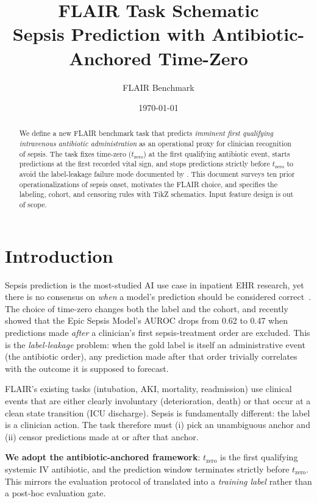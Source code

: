 \documentclass[11pt]{article}
\title{\textbf{FLAIR Task Schematic} \\[0.3em]
       Sepsis Prediction with Antibiotic-Anchored Time-Zero}
\author{FLAIR Benchmark}
\date{\today}
\newcommand{\tzero}{t_{\text{zero}}}
\begin{document}
\maketitle

\begin{abstract}
\noindent We define a new FLAIR benchmark task that predicts \emph{imminent
first qualifying intravenous antibiotic administration} as an
operational proxy for clinician recognition of sepsis. The task fixes
time-zero ($\tzero$) at the first qualifying antibiotic event, starts
predictions at the first recorded vital sign, and stops predictions
strictly before $\tzero$ to avoid the label-leakage failure mode
documented by \citet{kamran2024sepsis}. This document surveys ten prior
operationalizations of sepsis onset, motivates the FLAIR choice, and
specifies the labeling, cohort, and censoring rules with TikZ schematics.
Input feature design is out of scope.
\end{abstract}

\section{Introduction}

Sepsis prediction is the most-studied AI use case in inpatient EHR
research, yet there is no consensus on \emph{when} a model's prediction
should be considered correct~\citep{singer2016sepsis3, rhee2019sepsis}.
The choice of time-zero changes both the label and the cohort, and
\citet{kamran2024sepsis} recently showed that the Epic Sepsis Model's
AUROC drops from 0.62 to 0.47 when predictions made \emph{after} a
clinician's first sepsis-treatment order are excluded. This is the
\emph{label-leakage} problem: when the gold label is itself an
administrative event (the antibiotic order), any prediction made after
that order trivially correlates with the outcome it is supposed to
forecast.

FLAIR's existing tasks (intubation, AKI, mortality, readmission) use
clinical events that are either clearly involuntary (deterioration,
death) or that occur at a clean state transition (ICU discharge). Sepsis
is fundamentally different: the label is a clinician action. The task
therefore must (i) pick an unambiguous anchor and (ii) censor predictions
made at or after that anchor.

\textbf{We adopt the antibiotic-anchored framework}: $\tzero$ is the
first qualifying systemic IV antibiotic, and the prediction window
terminates strictly before $\tzero$. This mirrors the evaluation
protocol of \citet{kamran2024sepsis} translated into a \emph{training
label} rather than a post-hoc evaluation gate.
\end{document}
